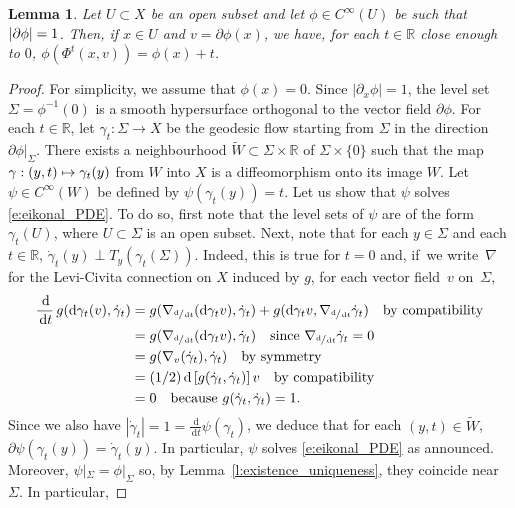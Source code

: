 \documentclass[JEP,XML,SOM,Unicode,published]{cedram}
\newcommand\mto{\mathchoice{\longmapsto}{\mapsto}{\mapsto}{\mapsto}}
\newcommand{\sd}{\mathrm{d}}
\newcommand{\rd}{\,\mathrm{d}}
\theoremstyle{plain}
\newtheorem{lemma}[theorem]{Lemma}
\theoremstyle{definition}
\newcommand{\R}{\mathbb{R}}
\begin{document}
\begin{appendix}
\begin{lemma}\label{l:description_eikonal}
Let $U\subset X$ be an open subset and let $\phi\in C^\infty(U)$ be such that $|\partial\phi|=\nobreak1$. Then, if $x\in U$ and $v=\partial\phi(x)$, we have, for each $t\in \R$ close enough to $0$, $\phi(\Phi^t(x,v))=\phi(x)+t$.
\end{lemma}

\begin{proof}
For simplicity, we assume that $\phi(x)=0$. Since $|\partial_x\phi|=1$, the level set $\Sigma=\phi^{-1}(0)$ is a smooth hypersurface orthogonal to the vector field $\partial\phi$. For each $t\in\R$, let $\gamma_t:\Sigma\to X$ be the geodesic flow starting from $\Sigma$ in the direction $\partial\phi|_\Sigma$. There exists a neighbourhood $\tilde{W}\subset\Sigma\times\R$ of $\Sigma\times\{0\}$ such that the map $\gamma:(y,t)\mto\gamma_t(y)$ from $W$ into $X$ is a diffeomorphism onto its image $W$. Let $\psi\in C^\infty(W)$ be defined by $\psi(\gamma_t(y))=t$. Let us show that $\psi$ solves \eqref{e:eikonal_PDE}. To do so, first note that the level sets of $\psi$ are of the form $\gamma_t(U)$, where $U\subset\Sigma$ is an open subset. Next, note that for each $y\in\Sigma$ and each $t\in\R$, $\dot{\gamma}_t(y)\perp T_y(\gamma_t(\Sigma))$. Indeed, this is true for $t=0$ and, if~we write~$\nabla$ for the Levi-Civita connection on $X$ induced by $g$, for each vector field~$v$ on~$\Sigma$,
\begin{align*}
\frac{\rd}{\rd t}\, g(\sd \gamma_t(v),\dot{\gamma}_t)&=g(\nabla_{\sfrac{\sd}{\rd t}}(\sd \gamma_t v),\dot{\gamma}_t)+g(\sd \gamma_t v,\nabla_{\sfrac{\sd}  {\rd t}}\dot{\gamma}_t)\quad\textup{by compatibility}\\
&=g(\nabla_{\sfrac{\sd}{\rd t}}(\sd \gamma_t v),\dot{\gamma}_t)\quad\textup{since }\nabla_{\sfrac{\sd}  {\rd t}}\dot{\gamma}_t=0\\
&=g(\nabla_v(\dot{\gamma}_t),\dot{\gamma}_t)\quad\textup{by symmetry}\\
&=(1/2)\rd \left[g(\dot{\gamma}_t,\dot{\gamma}_t)\right]v\quad\textup{by compatibility}\\
&=0\quad\textup{because }g(\dot{\gamma}_t,\dot{\gamma}_t)=1.
\end{align*}
Since we also have $|\dot{\gamma}_t|=1=\frac{\rd}{\rd t}\psi(\gamma_t)$, we deduce that for each $(y,t)\in\tilde{W}$, $\partial\psi(\gamma_t(y))=\dot{\gamma}_t(y)$. In particular, $\psi$ solves \eqref{e:eikonal_PDE} as announced. Moreover, $\psi|_\Sigma=\phi|_\Sigma$ so, by Lem\-ma~\ref{l:existence_uniqueness}, they coincide near $\Sigma$. In particular,

\end{proof}
\end{appendix}
\end{document}
